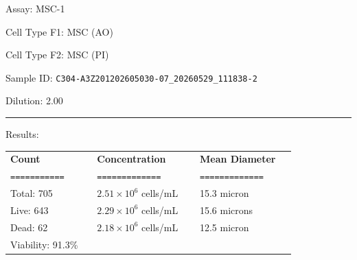 \documentclass[UTF8,10pt,a4paper,fontset=fandol]{ctexart}
\newcommand{\fieldvalue}[1]{#1}
\begin{document}
\newpage

\noindent
Assay: \fieldvalue{MSC-1}

\vspace{0.5em}
\noindent
Cell Type F1: \fieldvalue{MSC (AO)}

\noindent
Cell Type F2: \fieldvalue{MSC (PI)}

\vspace{0.5em}
\noindent
Sample ID: \fieldvalue{\texttt{C304-A3Z201202605030-07\_20260529\_111838-2}}

\noindent
Dilution: \fieldvalue{2.00}

\vspace{0.5em}
\hrule
\vspace{0.5em}

\noindent
Results:

\vspace{0.5em}
\noindent
\begin{tabular}{@{}p{0.27\linewidth}p{0.32\linewidth}p{0.30\linewidth}@{}}
\textbf{Count} & \textbf{Concentration} & \textbf{Mean Diameter} \\
\texttt{===========} & \texttt{=============} & \texttt{=============} \\[0.2em]

Total: \fieldvalue{705}
&
\fieldvalue{$2.51\times10^{6}$ cells/mL}
&
\fieldvalue{15.3 micron}
\\

Live: \fieldvalue{643}
&
\fieldvalue{$2.29\times10^{6}$ cells/mL}
&
\fieldvalue{15.6 microns}
\\

Dead: \fieldvalue{62}
&
\fieldvalue{$2.18\times10^{6}$ cells/mL}
&
\fieldvalue{12.5 micron}
\\

Viability: \fieldvalue{91.3\%}
&
&
\end{tabular}
\end{document}
